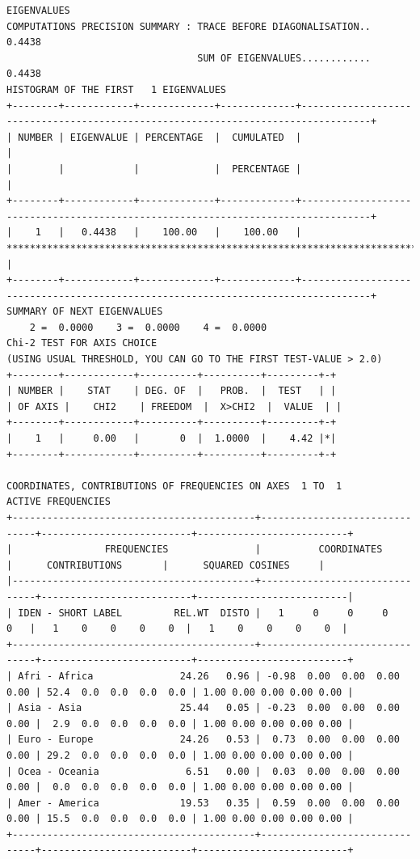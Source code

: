 \documentclass[a4paper,10pt,twocolumn]{article}
\begin{document}
\begin{landscape}
\begin{verbatim}
EIGENVALUES
COMPUTATIONS PRECISION SUMMARY : TRACE BEFORE DIAGONALISATION..   0.4438
                                 SUM OF EIGENVALUES............   0.4438
HISTOGRAM OF THE FIRST   1 EIGENVALUES
+--------+------------+-------------+-------------+----------------------------------------------------------------------------------+
| NUMBER | EIGENVALUE | PERCENTAGE  |  CUMULATED  |                                                                                  |
|        |            |             |  PERCENTAGE |                                                                                  |
+--------+------------+-------------+-------------+----------------------------------------------------------------------------------+
|    1   |   0.4438   |    100.00   |    100.00   | ******************************************************************************** |
+--------+------------+-------------+-------------+----------------------------------------------------------------------------------+
SUMMARY OF NEXT EIGENVALUES
    2 =  0.0000    3 =  0.0000    4 =  0.0000
Chi-2 TEST FOR AXIS CHOICE
(USING USUAL THRESHOLD, YOU CAN GO TO THE FIRST TEST-VALUE > 2.0)
+--------+------------+----------+----------+---------+-+
| NUMBER |    STAT    | DEG. OF  |   PROB.  |  TEST   | |
| OF AXIS |    CHI2    | FREEDOM  |  X>CHI2  |  VALUE  | |
+--------+------------+----------+----------+---------+-+
|    1   |     0.00   |       0  |  1.0000  |    4.42 |*|
+--------+------------+----------+----------+---------+-+

COORDINATES, CONTRIBUTIONS OF FREQUENCIES ON AXES  1 TO  1
ACTIVE FREQUENCIES
+------------------------------------------+-------------------------------+--------------------------+--------------------------+
|                FREQUENCIES               |          COORDINATES          |      CONTRIBUTIONS       |      SQUARED COSINES     |
|------------------------------------------+-------------------------------+--------------------------+--------------------------|
| IDEN - SHORT LABEL         REL.WT  DISTO |   1     0     0     0     0   |   1    0    0    0    0  |   1    0    0    0    0  |
+------------------------------------------+-------------------------------+--------------------------+--------------------------+
| Afri - Africa               24.26   0.96 | -0.98  0.00  0.00  0.00  0.00 | 52.4  0.0  0.0  0.0  0.0 | 1.00 0.00 0.00 0.00 0.00 |
| Asia - Asia                 25.44   0.05 | -0.23  0.00  0.00  0.00  0.00 |  2.9  0.0  0.0  0.0  0.0 | 1.00 0.00 0.00 0.00 0.00 |
| Euro - Europe               24.26   0.53 |  0.73  0.00  0.00  0.00  0.00 | 29.2  0.0  0.0  0.0  0.0 | 1.00 0.00 0.00 0.00 0.00 |
| Ocea - Oceania               6.51   0.00 |  0.03  0.00  0.00  0.00  0.00 |  0.0  0.0  0.0  0.0  0.0 | 1.00 0.00 0.00 0.00 0.00 |
| Amer - America              19.53   0.35 |  0.59  0.00  0.00  0.00  0.00 | 15.5  0.0  0.0  0.0  0.0 | 1.00 0.00 0.00 0.00 0.00 |
+------------------------------------------+-------------------------------+--------------------------+--------------------------+


\end{verbatim}
\end{landscape}
\end{document}
